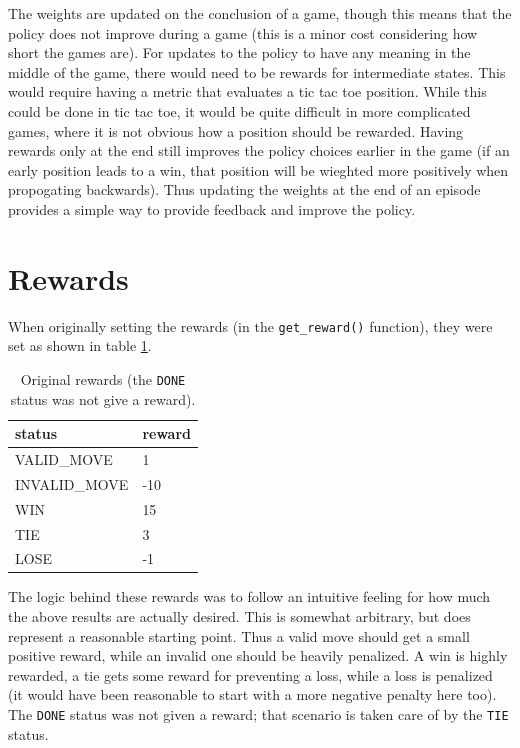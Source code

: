 \documentclass{article}
\renewcommand{\arraystretch}{1.25}
\begin{document}
   The weights are updated on the conclusion of a game, though this means that the policy does not improve
   during a game (this is a minor cost considering how short the games are). For updates to the policy to have
   any meaning in the middle of the game, there would need to be rewards for intermediate states. This would
   require having a metric that evaluates a tic tac toe position. While this could be done in tic tac toe,
   it would be quite difficult in more complicated games, where it is not obvious how a position should be
   rewarded. Having rewards only at the end still improves the policy choices earlier in the game (if an early
   position leads to a win, that position will be wieghted more positively when propogating backwards).
   Thus updating the weights at the end of an episode provides a simple way to provide feedback and improve the
   policy.

   \section{Rewards}
   When originally setting the rewards (in the \texttt{get\_reward()} function), they were set as shown in
   table \ref{table:part4}.
      \begin{table}[h]
         \centering
         \renewcommand{\arraystretch}{1.5}

         \begin{tabular}{ p{8em}|l }
            \hline
            status     &     reward      \\
            \hline \hline
            VALID\_MOVE       &  1       \\
            INVALID\_MOVE     &  -10     \\
            WIN               &  15      \\
            TIE               &  3       \\
            LOSE              &  -1      \\
            \hline
         \end{tabular}

         \caption{ Original rewards (the \texttt{DONE} status was not give a reward). }
         \label{table:part4}
      \end{table}
   The logic behind these rewards was to follow an intuitive feeling for how much the above results
   are actually desired. This is somewhat arbitrary, but does represent a reasonable starting point.
   Thus a valid move should get a small positive reward, while an invalid one should
   be heavily penalized. A win is highly rewarded, a tie gets some reward for preventing a loss, while a
   loss is penalized (it would have been reasonable to start with a more negative penalty here too).
   The \texttt{DONE} status was not given a reward; that scenario is taken care of by the \texttt{TIE} status.
\end{document}
